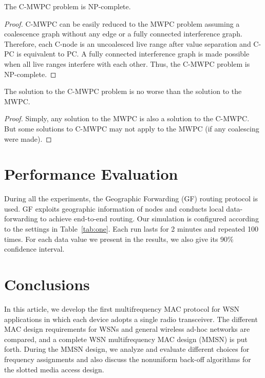 \documentclass[prodmode,acmtecs]{acmsmall}
\begin{document}
\begin{lemma}
The C-MWPC problem is NP-complete.
\end{lemma}
\begin{proof} C-MWPC can be easily reduced to the MWPC problem assuming a
coalescence graph without any edge or a fully connected interference graph.
Therefore, each C-node is an uncoalesced live range after value separation
and C-PC is equivalent to PC. A fully connected interference graph is made
possible when all live ranges interfere with each other. Thus, the C-MWPC
problem is NP-complete.
\end{proof}

\begin{lemma}The solution to the C-MWPC problem is no
worse than the solution to the MWPC.
\end{lemma}
\begin{proof}
Simply, any solution to the MWPC is also a solution to the
C-MWPC. But some solutions to C-MWPC may not apply to the MWPC (if any
coalescing were made).
\end{proof}

\section{Performance Evaluation}

During all the experiments, the Geographic Forwarding (GF)
\cite{Akyildiz-01} routing protocol is used. GF exploits geographic
information of nodes and conducts local data-forwarding to achieve
end-to-end routing. Our simulation is
configured according to the settings in
Table~\ref{tab:one}. Each run lasts for 2 minutes and
repeated 100 times. For each data value we present in the results,
we also give its 90\% confidence interval.

\section{Conclusions}

In this article, we develop the first multifrequency MAC protocol for
WSN applications in which each device adopts a
single radio transceiver. The different MAC design requirements for
WSNs and general wireless ad-hoc networks are
compared, and a complete WSN multifrequency MAC design (MMSN) is
put forth. During the MMSN design, we analyze and evaluate different
choices for frequency assignments and also discuss the nonuniform
back-off algorithms for the slotted media access design.
\end{document}
